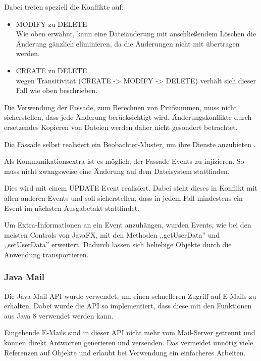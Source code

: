 \documentclass[oneside, ngerman, toc=bibliography,bibliography=totoc,listof=entryprefix, open=right,numbers=noenddot,fontsize=12pt]{scrbook}
\begin{document}
\bigskip
Dabei treten speziell die Konflikte auf:

\begin{itemize}
    \item MODIFY zu DELETE \\
    Wie oben erwähnt, kann eine Dateiänderung mit anschließendem Löschen die Änderung gänzlich eliminieren, da die Änderungen nicht mit übertragen werden.
    \item CREATE zu DELETE \\
    wegen Transitivität (CREATE -> MODIFY -> DELETE) verhält sich dieser Fall wie oben beschrieben.
\end{itemize}

Die Verwendung der Fassade, zum Berechnen von Prüfsummen, muss nicht sicherstellen, dass jede Änderung berücksichtigt wird.
Änderungskonflikte durch ersetzendes Kopieren von Dateien werden daher nicht gesondert betrachtet.

Die Fassade selbst realisiert ein Beobachter-Muster, um ihre Dienste anzubieten \cite{gamma2011entwurfsmuster}.

Als Kommunikationsextra ist es möglich, der Fassade Events zu injizieren. So muss nicht zwangsweise eine Änderung auf dem Dateisystem stattfinden.

Dies wird mit einem UPDATE Event realisiert.
Dabei steht dieses in Konflikt mit allen anderen Events und soll sicherstellen, dass in jedem Fall mindestens ein Event im nächsten Ausgabetakt stattfindet.

Um Extra-Informationen an ein Event anzuhängen, wurden Events, wie bei den meisten Controls von JavaFX, mit den Methoden ,,getUserData'' und ,,setUserData'' erweitert. Dadurch lassen sich beliebige Objekte durch die Anwendung transportieren. 



\subsubsection{Java Mail}
Die Java-Mail-API wurde verwendet, um einen schnelleren Zugriff auf E-Mails zu erhalten. Dabei wurde die API so implementiert, dass diese mit den Funktionen aus Java 8 verwendet werden kann.

Eingehende E-Mails sind in dieser API nicht mehr vom Mail-Server getrennt und können direkt Antworten generieren und versenden. Das vermeidet unnötig viele Referenzen auf Objekte und erlaubt bei Verwendung ein einfacheres Arbeiten.
\end{document}

